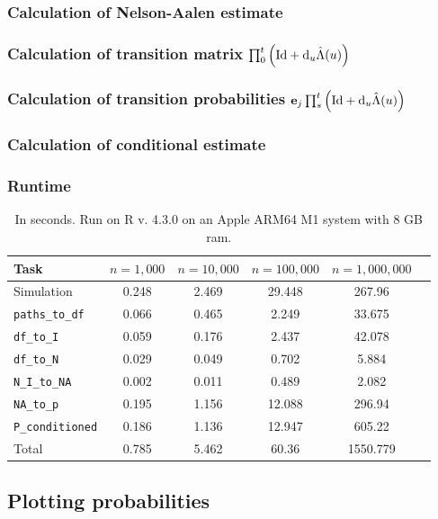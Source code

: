 \documentclass[12pt,letter,twoside]{article}
\theoremstyle{plain}
\theoremstyle{definition}
\theoremstyle{remark}
\begin{document}
\subsubsection{Calculation of Nelson-Aalen estimate}\label{appendix:A2.4}\vspace{10pt}


\subsubsection{Calculation of transition matrix $\prod_0^t\Big(\text{Id} + \text d_u \hat\Lambda(u)\Big)$}\label{appendix:A2.5}\vspace{10pt}


\subsubsection{Calculation of transition probabilities $\mathbf e_j\prod_s^t\Big(\text{Id} + \text d_u \hat\Lambda(u)\Big)$}\label{appendix:A2.6}\vspace{10pt}


\subsubsection{Calculation of conditional estimate}\label{appendix:A2.7}\vspace{10pt}


\subsubsection{Runtime}
\begin{table}[h]
    \centering
    \begin{tabular}{lccccc}
    \toprule
    Task & $n=1,000$ & $n=10,000$ & $n=100,000$ & $n=1,000,000$\\
    \midrule
    Simulation & 0.248 & 2.469 & 29.448 & 267.96\\
    \midrule
    \texttt{paths\_to\_df} & 0.066 & 0.465 & 2.249 & 33.675\\
    \texttt{df\_to\_I} & 0.059 & 0.176 & 2.437 & 42.078\\
    \texttt{df\_to\_N} & 0.029 & 0.049 & 0.702 & 5.884\\
    \texttt{N\_I\_to\_NA} & 0.002 & 0.011 & 0.489 & 2.082\\
    \texttt{NA\_to\_p} & 0.195 & 1.156 & 12.088 & 296.94\\
    \texttt{P\_conditioned} & 0.186 & 1.136 & 12.947 & 605.22 \\
    \midrule
    Total & 0.785 & 5.462 & 60.36 & 1550.779\\
    \bottomrule
    \end{tabular}
    \caption{In seconds. Run on R v. 4.3.0 on an Apple ARM64 M1 system with 8 GB ram.}
\end{table}
\pagebreak
\subsection{Plotting probabilities}\label{appendix:A3}\vspace{15pt}

\end{document}
